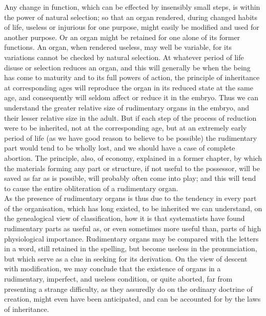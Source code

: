 \indent Any change in function, which can be effected by insensibly small steps, is within the power of natural selection; so that an organ rendered, during changed habits of life, useless or injurious for one purpose, might easily be modified and used for another purpose. Or an organ might be retained for one alone of its former functions. An organ, when rendered useless, may well be variable, for its variations cannot be checked by natural selection. At whatever period of life disuse or selection reduces an organ, and this will generally be when the being has come to maturity and to its full powers of action, the principle of inheritance at corresponding ages will reproduce the organ in its reduced state at the same age, and consequently will seldom affect or reduce it in the embryo. Thus we can understand the greater relative size of rudimentary organs in the embryo, and their lesser relative size in the adult. But if each step of the process of reduction were to be inherited, not at the corresponding age, but at an extremely early period of life (as we have good reason to believe to be possible) the rudimentary part would tend to be wholly lost, and we should have a case of complete abortion. The principle, also, of economy, explained in a former chapter, by which the materials forming any part or structure, if not useful to the possessor, will be saved as far as is possible, will probably often come into play; and this will tend to cause the entire obliteration of a rudimentary organ.~\\
\indent As the presence of rudimentary organs is thus due to the tendency in every part of the organisation, which has long existed, to be inherited we can understand, on the genealogical view of classification, how it is that systematists have found rudimentary parts as useful as, or even sometimes more useful than, parts of high physiological importance. Rudimentary organs may be compared with the letters in a word, still retained in the spelling, but become useless in the pronunciation, but which serve as a clue in seeking for its derivation. On the view of descent with modification, we may conclude that the existence of organs in a rudimentary, imperfect, and useless condition, or quite aborted, far from presenting a strange difficulty, as they assuredly do on the ordinary doctrine of creation, might even have been anticipated, and can be accounted for by the laws of inheritance.~\\

